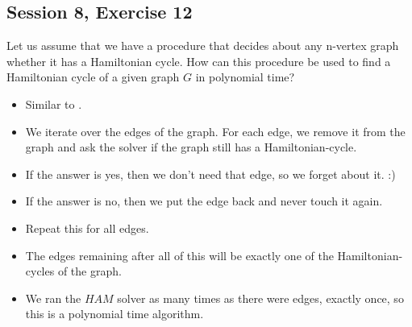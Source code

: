 \subsection {Session 8, Exercise 12}
\label{8f12}


Let us assume that we have a procedure that decides about any n-vertex graph whether it has a Hamiltonian
cycle. How can this procedure be used to find a Hamiltonian cycle of a given graph $G$ in polynomial time?


\begin{itemize}
    \item Similar to .
    \item We iterate over the edges of the graph. For each edge, we remove it from the graph and ask the solver if the graph still has a Hamiltonian-cycle.
    \item If the answer is yes, then we don't need that edge, so we forget about it. :)
    \item If the answer is no, then we put the edge back and never touch it again.
    \item Repeat this for all edges.
    \item The edges remaining after all of this will be exactly one of the Hamiltonian-cycles of the graph.
    \item We ran the $HAM$ solver as many times as there were edges, exactly once, so this is a polynomial time algorithm.
\end{itemize}

